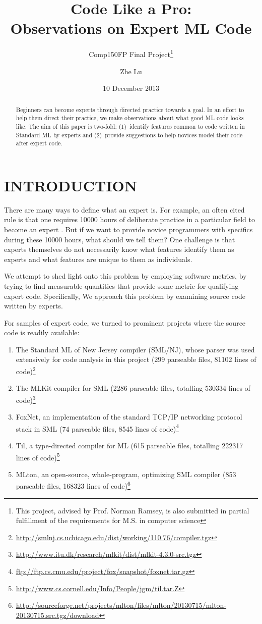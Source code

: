 \documentclass[12pt,abstracton]{scrartcl}
\title{Code Like a Pro:\\Observations on Expert ML Code}
\subtitle{Comp150FP Final Project\footnote{This project, advised by Prof. Norman Ramsey, is also submitted in partial fulfillment of the requirements for M.S. in computer science}}
\author{Zhe Lu}
\date{10 December 2013}
\begin{document}


\maketitle
\begin{abstract}
Beginners can become experts through directed practice towards a goal. In an effort to
help them direct their practice, we make observations about what good ML code looks like.
The aim of this paper is two-fold: (1)~identify features common to code written in Standard ML by experts and
(2)~provide suggestions to help novices model their code after expert code.
\end{abstract}
\section{INTRODUCTION}
There are many ways to define what an expert is.
For example, an often cited rule is that one requires 10000 hours of deliberate practice
in a particular field to become an expert \cite{Gla08}. But if we want to provide novice programmers
with specifics during these 10000 hours, what should we tell them? One challenge is that experts themselves
do not necessarily know what features identify them as experts and what features are unique to them as individuals.

We attempt to shed light onto this problem by employing software metrics,
by trying to find measurable quantities
that provide some metric for qualifying expert code. Specifically,
We approach this problem by examining source code written by experts.

For samples of expert code, we turned to prominent projects where the source code is readily available:
\begin{enumerate}
\item The Standard ML of New Jersey compiler (SML/NJ), whose parser was used extensively for code analysis in this project (299 parseable files, 81102 lines of code)\footnote{\url{http://smlnj.cs.uchicago.edu/dist/working/110.76/compiler.tgz}}
\item The MLKit compiler for SML (2286 parseable files, totalling 530334 lines of code)\footnote{\url{http://www.itu.dk/research/mlkit/dist/mlkit-4.3.0-src.tgz}}
\item FoxNet, an implementation of the standard TCP/IP networking protocol stack in SML (74 parseable files, 8545 lines of code)\footnote{\url{ftp://ftp.cs.cmu.edu/project/fox/snapshot/foxnet.tar.gz}}
\item Til, a type-directed compiler for ML (615 parseable files, totalling 222317 lines of code)\footnote{\url{http://www.cs.cornell.edu/Info/People/jgm/til.tar.Z}}
\item MLton, an open-source, whole-program, optimizing SML compiler (853 parseable files, 168323 lines of code)\footnote{\url{http://sourceforge.net/projects/mlton/files/mlton/20130715/mlton-20130715.src.tgz/download}}
\end{enumerate}
\end{document}
